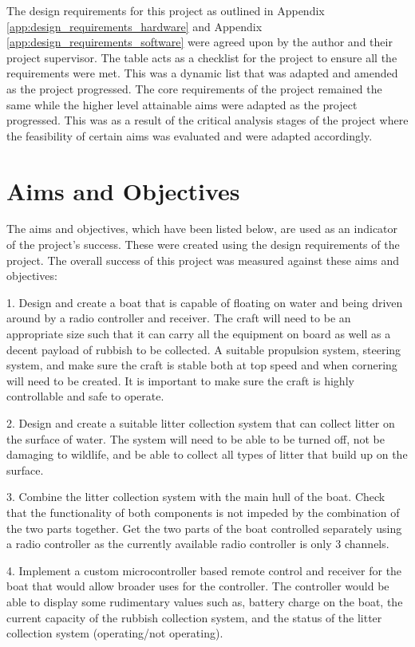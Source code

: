 \documentclass [12pt]{article}
\begin{document}
The design requirements for this project as outlined in Appendix \ref{app:design_requirements_hardware} and Appendix \ref{app:design_requirements_software} were agreed upon by the author and their project supervisor. The table acts as a checklist for the project to ensure all the requirements were met. This was a dynamic list that was adapted and amended as the project progressed. The core requirements of the project remained the same while the higher level attainable aims were adapted as the project progressed. This was as a result of the critical analysis stages of the project where the feasibility of certain aims was evaluated and were adapted accordingly. 

\section{Aims and Objectives}

The aims and objectives, which have been listed below, are used as an indicator of the project's success. These were created using the design requirements of the project. The overall success of this project was measured against these aims and objectives: 

1.	Design and create a boat that is capable of floating on water and being driven around by a radio controller and receiver. The craft will need to be an appropriate size such that it can carry all the equipment on board as well as a decent payload of rubbish to be collected. A suitable propulsion system, steering system, and make sure the craft is stable both at top speed and when cornering will need to be created. It is important to make sure the craft is highly controllable and safe to operate. 

2.	Design and create a suitable litter collection system that can collect litter on the surface of water. The system will need to be able to be turned off, not be damaging to wildlife, and be able to collect all types of litter that build up on the surface. 

3.	Combine the litter collection system with the main hull of the boat. Check that the functionality of both components is not impeded by the combination of the two parts together. Get the two parts of the boat controlled separately using a radio controller as the currently available radio controller is only 3 channels.

4.	Implement a custom microcontroller based remote control and receiver for the boat that would allow broader uses for the controller. The controller would be able to display some rudimentary values such as, battery charge on the boat, the current capacity of the rubbish collection system, and the status of the litter collection system (operating/not operating).
\end{document}
